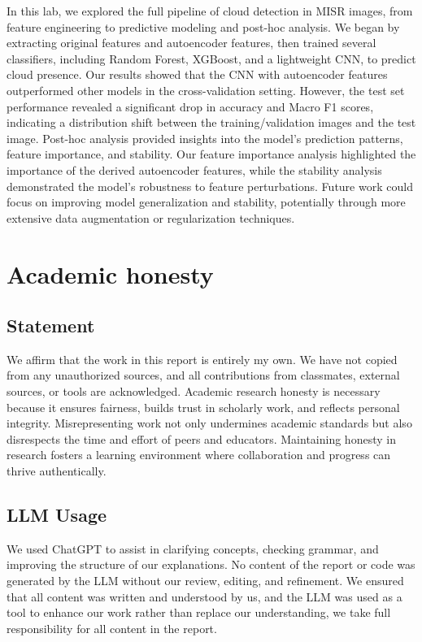\documentclass[10pt,letterpaper]{article}
\begin{document}
In this lab, we explored the full pipeline of cloud detection in MISR images, from feature engineering to predictive modeling and post-hoc analysis. We began by extracting original features and autoencoder features, then trained several classifiers, including Random Forest, XGBoost, and a lightweight CNN, to predict cloud presence. Our results showed that the CNN with autoencoder features outperformed other models in the cross-validation setting. However, the test set performance revealed a significant drop in accuracy and Macro F1 scores, indicating a distribution shift between the training/validation images and the test image. Post-hoc analysis provided insights into the model's prediction patterns, feature importance, and stability. Our feature importance analysis highlighted the importance of the derived autoencoder features, while the stability analysis demonstrated the model's robustness to feature perturbations. Future work could focus on improving model generalization and stability, potentially through more extensive data augmentation or regularization techniques.

\newpage

\printbibliography

\appendix
\section{Academic honesty}
\subsection{Statement}
We affirm that the work in this report is entirely my own. We have not copied from any unauthorized sources, and all contributions from classmates, external sources, or tools are acknowledged. Academic research honesty is necessary because it ensures fairness, builds trust in scholarly work, and reflects personal integrity. Misrepresenting work not only undermines academic standards but also disrespects the time and effort of peers and educators. Maintaining honesty in research fosters a learning environment where collaboration and progress can thrive authentically.

\subsection{LLM Usage}

We used ChatGPT to assist in clarifying concepts, checking grammar, and improving the structure of our explanations. No content of the report or code was generated by the LLM without our review, editing, and refinement. We ensured that all content was written and understood by us, and the LLM was used as a tool to enhance our work rather than replace our understanding, we take full responsibility for all content in the report.
\end{document}

